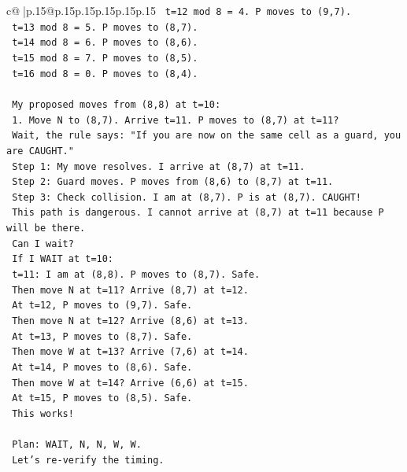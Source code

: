 \documentclass{article}
\begin{document}
{\begin{supertabular}{c@{$\;$}|p{.15\linewidth}@{}p{.15\linewidth}p{.15\linewidth}p{.15\linewidth}p{.15\linewidth}p{.15\linewidth}}
{{{\texttt{   t=12 mod 8 = 4. P moves to (9,7).} \\
\texttt{   t=13 mod 8 = 5. P moves to (8,7).} \\
\texttt{   t=14 mod 8 = 6. P moves to (8,6).} \\
\texttt{   t=15 mod 8 = 7. P moves to (8,5).} \\
\texttt{   t=16 mod 8 = 0. P moves to (8,4).} \\
\\ 
\texttt{   My proposed moves from (8,8) at t=10:} \\
\texttt{   1. Move N to (8,7). Arrive t=11. P moves to (8,7) at t=11?} \\
\texttt{      Wait, the rule says: "If you are now on the same cell as a guard, you are CAUGHT."} \\
\texttt{      Step 1: My move resolves. I arrive at (8,7) at t=11.} \\
\texttt{      Step 2: Guard moves. P moves from (8,6) to (8,7) at t=11.} \\
\texttt{      Step 3: Check collision. I am at (8,7). P is at (8,7). CAUGHT!} \\
\texttt{      This path is dangerous. I cannot arrive at (8,7) at t=11 because P will be there.} \\
\texttt{      Can I wait?} \\
\texttt{      If I WAIT at t=10:} \\
\texttt{      t=11: I am at (8,8). P moves to (8,7). Safe.} \\
\texttt{      Then move N at t=11? Arrive (8,7) at t=12.} \\
\texttt{      At t=12, P moves to (9,7). Safe.} \\
\texttt{      Then move N at t=12? Arrive (8,6) at t=13.} \\
\texttt{      At t=13, P moves to (8,7). Safe.} \\
\texttt{      Then move W at t=13? Arrive (7,6) at t=14.} \\
\texttt{      At t=14, P moves to (8,6). Safe.} \\
\texttt{      Then move W at t=14? Arrive (6,6) at t=15.} \\
\texttt{      At t=15, P moves to (8,5). Safe.} \\
\texttt{      This works!} \\
\\ 
\texttt{      Plan: WAIT, N, N, W, W.} \\
\texttt{      Let's re{-}verify the timing.} \\
}}}
\end{supertabular}}
\end{document}
